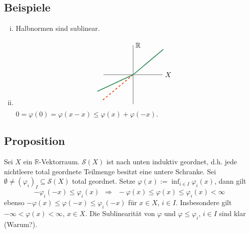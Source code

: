 \subsection[Beispiele für sublineare Abbildungen]{Beispiele} %
\label{sub:218}
\begin{enumerate}[(i)]
	\item Halbnormen sind sublinear.
	\item \[
		\begin{tikzpicture}[scale=0.5]
			\draw (-3,0) -- (3,0) node[right]{$X$};
			\draw (0,-3) -- (0,3) node[right]{$\mathds{R}$};
			\draw[very thick, dashed,OrangeRed2] (0,0) -- (220:4);
			\draw[very thick,SeaGreen4] (40:4) -- (0,0) -- (205:4);
		\end{tikzpicture}
	\]
	$0 = \varphi(0) = \varphi(x-x) \le \varphi(x) + \varphi(-x)$.
\end{enumerate}

\subsection[Proposition: Die sublinearen Abbildungen $\mathcal{S}(X)$ sind nach unten induktiv geordnet]{Proposition} %
\label{sub:219}
Sei $X$ ein $\mathds{R}$-Vektorraum. $\mathcal{S}(X)$ ist nach unten induktiv geordnet, d.h. jede nichtleere total geordnete Teilmenge besitzt eine untere Schranke.
Sei $\emptyset \not= (\varphi_i)_{I} \subseteq \mathcal{S}(X)$ total geordnet. Setze $\varphi(x) := \inf_{i \in I} \varphi_i(x)$, dann gilt 
\[
	- \varphi_i(-x) \le \varphi_i(x) \enspace\Longrightarrow \enspace- \varphi(x) \le \varphi(x) \le \varphi_i(x) < \infty
\]
ebenso $-\varphi(x) \le \varphi(-x) \le \varphi_i(-x)$ für $x \in X$, $i \in I$. Insbesondere gilt $- \infty <  \varphi(x) < \infty$, $x \in X$. 
Die Sublinearität von $\varphi$ und $\varphi \le \varphi_i$, $i \in I$ sind klar (Warum?). \bewende


